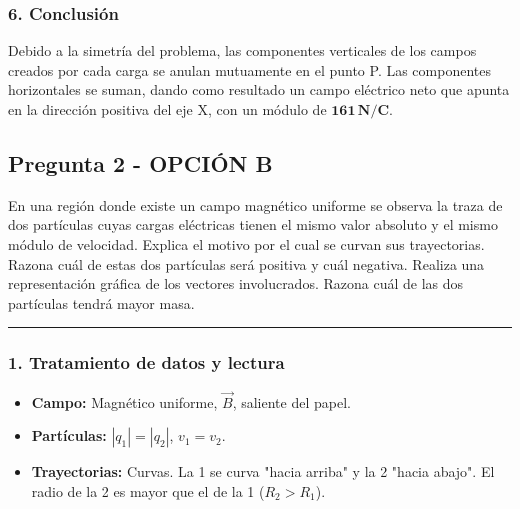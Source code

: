 \subsubsection*{6. Conclusión}
\begin{cajaconclusion}
    Debido a la simetría del problema, las componentes verticales de los campos creados por cada carga se anulan mutuamente en el punto P. Las componentes horizontales se suman, dando como resultado un campo eléctrico neto que apunta en la dirección positiva del eje X, con un módulo de $\mathbf{161 \, N/C}$.
\end{cajaconclusion}

\newpage

\subsection{Pregunta 2 - OPCIÓN B}
\label{subsec:2B_2025_jun_res}

\begin{cajaenunciado}
En una región donde existe un campo magnético uniforme se observa la traza de dos partículas cuyas cargas eléctricas tienen el mismo valor absoluto y el mismo módulo de velocidad. Explica el motivo por el cual se curvan sus trayectorias. Razona cuál de estas dos partículas será positiva y cuál negativa. Realiza una representación gráfica de los vectores involucrados. Razona cuál de las dos partículas tendrá mayor masa.
\end{cajaenunciado}
\hrule

\subsubsection*{1. Tratamiento de datos y lectura}
\begin{itemize}
    \item \textbf{Campo:} Magnético uniforme, $\vec{B}$, saliente del papel.
    \item \textbf{Partículas:} $|q_1|=|q_2|$, $v_1=v_2$.
    \item \textbf{Trayectorias:} Curvas. La 1 se curva "hacia arriba" y la 2 "hacia abajo". El radio de la 2 es mayor que el de la 1 ($R_2 > R_1$).
\end{itemize}

